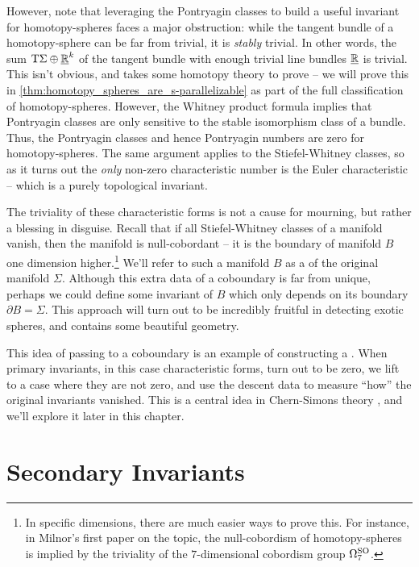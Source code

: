 However, note that leveraging the Pontryagin classes to build a useful invariant for homotopy-spheres faces a major obstruction: while the tangent bundle of a homotopy-sphere can be far from trivial, it is \emph{stably} trivial. In other words, the sum $\mathrm{T} \Sigma\oplus \underline{\mathbb{R}}^k$ of the tangent bundle with enough trivial line bundles $\underline{\mathbb{R}}$ is trivial. This isn't obvious, and takes some homotopy theory to prove -- we will prove this in \cref{thm:homotopy_spheres_are_s-parallelizable} as part of the full classification of homotopy-spheres. However, the Whitney product formula implies that Pontryagin classes are only sensitive to the stable isomorphism class of a bundle. Thus, the Pontryagin classes and hence Pontryagin numbers are zero for homotopy-spheres. The same argument applies to the Stiefel-Whitney classes, so as it turns out the \emph{only} non-zero characteristic number is the Euler characteristic -- which is a purely topological invariant.

The triviality of these characteristic forms is not a cause for mourning, but rather a blessing in disguise. Recall that if all Stiefel-Whitney classes of a manifold vanish, then the manifold is null-cobordant -- it is the boundary of manifold $B$ one dimension higher.\footnote{In specific dimensions, there are much easier ways to prove this. For instance, in Milnor's first paper \cite{milnor1956manifolds} on the topic, the null-cobordism of homotopy-spheres is implied by the triviality of the $7$-dimensional cobordism group $\Omega^{\operatorname{SO}}_7$.} We'll refer to such a manifold $B$ as a  of the original manifold $\Sigma$. Although this extra data of a coboundary is far from unique, perhaps we could define some invariant of $B$ which only depends on its boundary $\partial B=\Sigma$. This approach will turn out to be incredibly fruitful in detecting exotic spheres, and contains some beautiful geometry.

\begin{remark}
	This idea of passing to a coboundary is an example of constructing a . When primary invariants, in this case characteristic forms, turn out to be zero, we lift to a case where they are not zero, and use the descent data to measure ``how'' the original invariants vanished. This is a central idea in Chern-Simons theory \cite{chernsimons1974geometricinvariants}, and we'll explore it later in this chapter.
\end{remark}

\section{Secondary Invariants}

